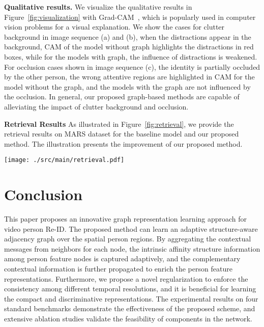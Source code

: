 \documentclass[journal]{IEEEtran}
\let\MYoriglatexcaption\caption
\renewcommand{\caption}[2][\relax]{\MYoriglatexcaption[#2]{#2}}
\begin{document}
\textbf{Qualitative results.}
We visualize the qualitative results in Figure~\ref{fig:visualization} with Grad-CAM~\cite{Selvaraju_2017_ICCV}, which is popularly used in computer vision problems for a visual explanation. We show the cases for clutter background in image sequence (a) and (b), when the distractions appear in the background, CAM of the model without graph highlights the distractions in red boxes, while for the models with graph, the influence of distractions is weakened. For occlusion cases shown in image sequence (c), the identity is partially occluded by the other person, the wrong attentive regions are highlighted in CAM for the model without the graph, and the models with the graph are not influenced by the occlusion. In general, our proposed graph-based methods are capable of alleviating the impact of clutter background and occlusion.

\textbf{Retrieval Results}
As illustrated in Figure~\ref{fig:retrieval}, we provide the retrieval results on MARS dataset for the baseline model and our proposed method. The illustration presents the improvement of our proposed method.
\begin{figure*}[ht]
    \begin{center}
        \texttt{[image: ./src/main/retrieval.pdf]}
    \end{center}
    \caption{Comparison of Rank-10 of our proposed method and baseline model. In each row, the images present the videos in the gallery. The images with the green box match the query, and the red box is the wrong matched result. Besides, the images with the yellow box are distracters, which is neglected while calculating the accuracy. \textbf{Best viewed in color.}}
    \label{fig:retrieval}
\end{figure*}

\section{Conclusion}\label{sec:conclusion}
This paper proposes an innovative graph representation learning approach for video person Re-ID. The proposed method can learn an adaptive structure-aware adjacency graph over the spatial person regions. By aggregating the contextual messages from neighbors for each node, the intrinsic affinity structure information among person feature nodes is captured adaptively, and the complementary contextual information is further propagated to enrich the person feature representations. Furthermore, we propose a novel regularization to enforce the consistency among different temporal resolutions, and it is beneficial for learning the compact and discriminative representations. The experimental results on four standard benchmarks demonstrate the effectiveness of the proposed scheme, and extensive ablation studies validate the feasibility of components in the network.

























\vfill
\end{document}
